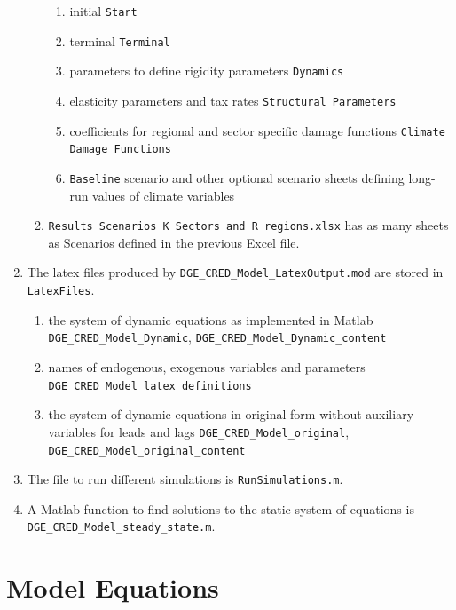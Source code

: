 \documentclass[10pt,a4paper]{article}
\begin{document}
\begin{enumerate}
\begin{enumerate}
\begin{enumerate}
\item initial {\tt Start}
\item terminal {\tt Terminal}
\item parameters to define rigidity parameters {\tt Dynamics}
\item elasticity parameters and tax rates {\tt Structural Parameters}
\item coefficients for regional and sector specific damage functions {\tt Climate Damage Functions}
\item {\tt Baseline} scenario and other optional scenario sheets defining long-run values of climate variables
\end{enumerate}
\item {\tt Results Scenarios K Sectors and R regions.xlsx} has as many sheets as Scenarios defined in the previous Excel file.
\end{enumerate}
\item The latex files produced by {\tt DGE_CRED_Model_LatexOutput.mod} are stored in {\tt LatexFiles}.
\begin{enumerate}
\item the system of dynamic equations as implemented in Matlab {\tt DGE_CRED_Model_Dynamic}, {\tt DGE_CRED_Model_Dynamic_content}
\item names of endogenous, exogenous variables and parameters {\tt DGE_CRED_Model_latex_definitions}
\item the system of dynamic equations in original form without auxiliary variables for leads and lags {\tt DGE_CRED_Model_original}, {\tt DGE_CRED_Model_original_content}
\end{enumerate}
\item The file to run different simulations is {\tt RunSimulations.m}.
\item A Matlab function to find solutions to the static system of equations is {\tt DGE_CRED_Model_steady_state.m}.
\end{enumerate}



\appendix
\section{Model Equations}
\footnotesize

\cleardoublepage

\end{document}
